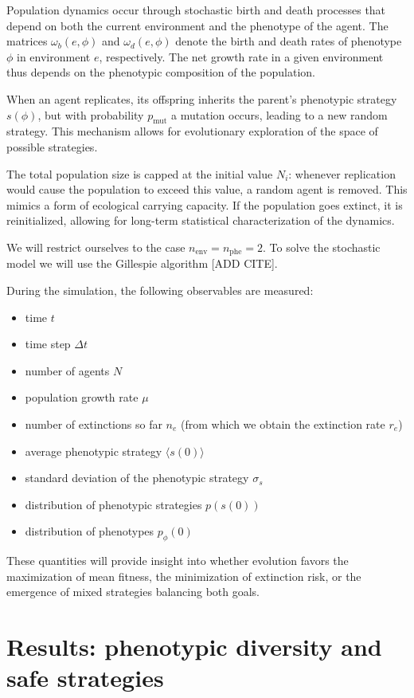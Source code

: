 \documentclass[a4paper,10pt,twocolumn]{article}
\begin{document}
Population dynamics occur through stochastic birth and death processes that depend on both the current environment and the phenotype of the agent. The matrices $\omega_b(e,\phi)$ and $\omega_d(e,\phi)$ denote the birth and death rates of phenotype $\phi$ in environment $e$, respectively. The net growth rate in a given environment thus depends on the phenotypic composition of the population.

When an agent replicates, its offspring inherits the parent's phenotypic strategy $s(\phi)$, but with probability $p_{\text{mut}}$ a mutation occurs, leading to a new random strategy. This mechanism allows for evolutionary exploration of the space of possible strategies.

The total population size is capped at the initial value $N_i$: whenever replication would cause the population to exceed this value, a random agent is removed. This mimics a form of ecological carrying capacity. If the population goes extinct, it is reinitialized, allowing for long-term statistical characterization of the dynamics.

We will restrict ourselves to the case $n_{\text{env}}=n_{\text{phe}}=2$. To solve the stochastic model we will use the Gillespie algorithm [ADD CITE].

During the simulation, the following observables are measured:
\begin{itemize}
    \item time $t$
    \item time step $\Delta t$
    \item number of agents $N$
    \item population growth rate $\mu$
    \item number of extinctions so far $n_e$ (from which we obtain the extinction rate $r_e$)
    \item average phenotypic strategy $\langle s(0)\rangle$
    \item standard deviation of the phenotypic strategy $\sigma_s$
    \item distribution of phenotypic strategies $p(s(0))$
    \item distribution of phenotypes $p_{\phi}(0)$
\end{itemize}
These quantities will provide insight into whether evolution favors the maximization of mean fitness, the minimization of extinction risk, or the emergence of mixed strategies balancing both goals.

\section{Results: phenotypic diversity and safe strategies} \label{sec:results}
\end{document}
